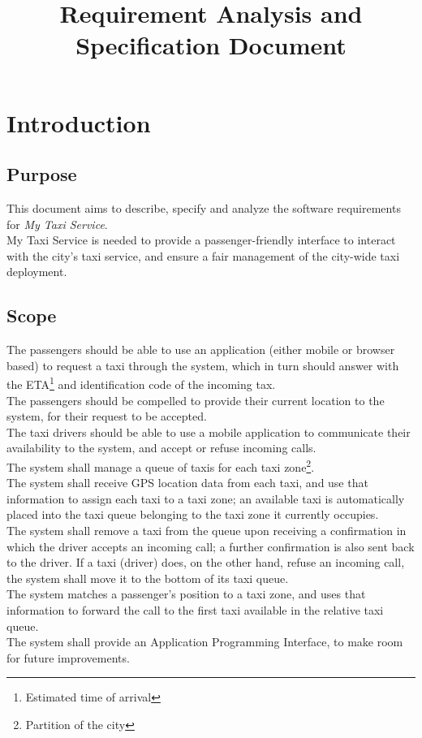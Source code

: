 \documentclass[a4paper,11pt]{report}
\title{Requirement Analysis and Specification Document}
\author{}
\begin{document}
\maketitle
\tableofcontents

\chapter*{Introduction}
\addtocounter{chapter}{1}

\section{Purpose}
This document aims to describe, specify and analyze the software requirements for \textit{My Taxi Service}. \\
My Taxi Service is needed to provide a passenger-friendly interface to interact with the city's taxi service, and ensure
a fair management of the city-wide taxi deployment.

\section{Scope}
The passengers should be able to use an application (either mobile or browser based) to request a taxi through the system,
which in turn should answer with the ETA\footnote{Estimated time of arrival} and identification code of the incoming tax. \\
The passengers should be compelled to provide their current location to the system, for their request to be accepted. \\
The taxi drivers should be able to use a mobile application to communicate their availability to the system, and accept
 or refuse incoming calls. \\
The system shall manage a queue of taxis for each taxi zone\footnote{Partition of the city}. \\
The system shall receive GPS location data from each taxi, and use that information to assign each taxi to a 
taxi zone; an available taxi is automatically placed into the taxi queue belonging to the taxi zone it currently occupies. \\
The system shall remove a taxi from the queue upon receiving a confirmation in which the driver accepts an incoming call; a
further confirmation is also sent back to the driver. If a taxi (driver) does, on the other hand, refuse an incoming call, the system
shall move it to the bottom of its taxi queue. \\
The system matches a passenger's position to a taxi zone, and uses that information to forward the call to the first taxi
available in the relative taxi queue. \\
The system shall provide an Application Programming Interface, to make room for future improvements.
\end{document}
